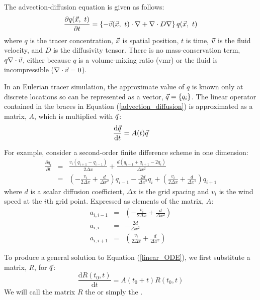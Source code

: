 The advection-diffusion equation is given as follows:
\begin{equation}
\frac{\partial q(\vec x, ~ t)}{\partial t} = \left \lbrace -\vec v(\vec x, ~t) \cdot \nabla + \nabla \cdot D \nabla \right \rbrace q(\vec x, ~ t)
\label{advection_diffusion}
\end{equation}
where $q$ is the tracer concentration, $\vec x$ is spatial position, 
$t$ is time, $\vec v$ is the fluid velocity, and $D$ is the diffusivity tensor.
There is no mass-conservation term, $q \nabla \cdot \vec v$,
either because $q$ is a volume-mixing ratio (vmr) or 
the fluid is incompressible ($\nabla \cdot \vec v = 0$).

In an Eulerian tracer simulation, the approximate value of $q$
is known only at discrete locations so can be represented as a vector,
$\vec q=\lbrace q_i \rbrace$.
The linear operator contained in the braces in Equation 
(\ref{advection_diffusion}) is approximated as a matrix, $A$, which is 
multiplied with $\vec q$:
\begin{equation}
\frac{\mathrm d \vec q}{\mathrm d t} = A(t) \vec q
\label{linear_ODE}
\end{equation}

For example, consider a second-order finite difference scheme in one dimension:
\begin{eqnarray}
\frac{\partial q_i}{\partial t} & = & \frac{v_i (q_{i+1} - q_{i-1})}{2 \Delta x} +
	\frac{d (q_{i-1} + q_{i+1} - 2 q_i)}{\Delta x^2} \\
& = & \left (- \frac{v_i}{2 \Delta x} + \frac{d}{\Delta x^2} \right ) q_{i-1} -
	\frac{2 d}{\Delta x^2} q_i + 
	\left (\frac{v_i}{2 \Delta x} + \frac{d}{\Delta x^2} \right ) q_{i+1} \label{finite_difference_diffusion}
\end{eqnarray}
where $d$ is a scalar diffusion coefficient, $\Delta x$ is the grid spacing
and $v_i$ is the wind speed at the $i$th grid point.
Expressed as elements of the matrix, $A$:
\begin{eqnarray}
a_{i,i-1} & = & \left (- \frac{v_i}{2 \Delta x} + \frac{d}{\Delta x^2} \right ) \\
	a_{i,i} & = & -\frac{2 d}{\Delta x^2} \\
a_{i,i+1} & = & \left (\frac{v_i}{2 \Delta x} + \frac{d}{\Delta x^2} \right )
\end{eqnarray}

To produce a general solution to Equation (\ref{linear_ODE}), 
we first substitute a matrix, $R$, for $\vec q$:
\begin{equation}
	\frac{\mathrm d R(t_0, t)}{\mathrm d t} = A(t_0+t) R(t_0, t)
\end{equation}
We will call the matrix $R$ the  or simply
the .

